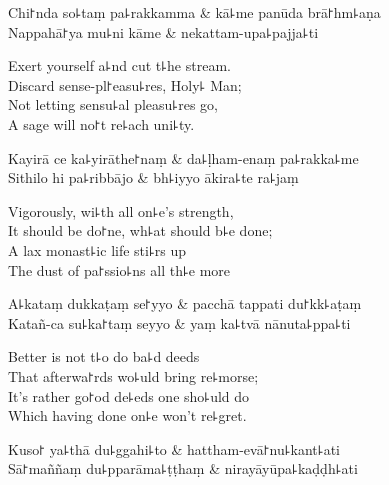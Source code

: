 \begin{twochants}
  Chi꜓nda so꜕taṃ pa꜕rakkamma & kā꜕me panūda brā꜓hm꜕aṇa \\
  Nappahā꜓ya mu꜕ni kāme & nekattam-upa꜕pajja꜕ti \\
\end{twochants}

\begin{english}
  Exert yourself a꜕nd cut t꜕he stream.\\
  Discard sense-pl꜓easu꜕res, Holy꜕ Man;\\
  Not letting sensu꜕al pleasu꜕res go,\\
  A sage will no꜓t re꜕ach uni꜕ty.
\end{english}

\begin{twochants}
  Kayirā ce ka꜕yirāthe꜓naṃ & da꜕ḷham-enaṃ pa꜕rakka꜕me \\
  Sithilo hi pa꜕ribbājo & bh꜕iyyo ākira꜕te ra꜕jaṃ \\
\end{twochants}

\begin{english}
  Vigorously, wi꜕th all on꜕e's strength,\\
  It should be do꜓ne, wh꜕at should b꜕e done;\\
  A lax monast꜕ic life sti꜕rs up\\
  The dust of pa꜓ssio꜕ns all th꜕e more
\end{english}

\begin{twochants}
  A꜕kataṃ dukkaṭaṃ se꜓yyo & pacchā tappati du꜓kk꜕aṭaṃ \\
  Katañ-ca su꜕ka꜓taṃ seyyo & yaṃ ka꜕tvā nānuta꜕ppa꜕ti \\
\end{twochants}

\begin{english}
  Better is not t꜕o do ba꜕d deeds\\
  That afterwa꜓rds wo꜕uld bring re꜕morse;\\
  It's rather go꜓od de꜕eds one sho꜕uld do\\
  Which having done on꜕e won't re꜕gret.
\end{english}

\begin{twochants}
  Kuso꜓ ya꜕thā du꜕ggahi꜕to & hattham-evā꜓nu꜕kant꜕ati \\
  Sā꜓maññaṃ du꜕pparāma꜕ṭṭhaṃ & nirayāyūpa꜕kaḍḍh꜕ati \\
\end{twochants}

